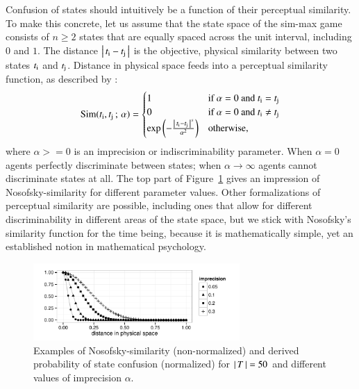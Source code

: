 \documentclass[fleqn,reqno,10pt]{article}
\newcommand{\impairment}{\ensuremath{\alpha}} %
\newcommand{\similarity}{\ensuremath{\mathrm{Sim}}} %
\begin{document}
Confusion of states should intuitively be a function of their
perceptual similarity. To make this concrete, let us assume that the
state space of the sim-max game consists of $n \ge 2$ states that are
equally spaced across the unit interval, including $0$ and $1$. The
distance $\left \lvert \, t_{\mathrm{i}} - t_{\mathrm{j}} \, \right\rvert$ is the objective, physical
similarity between two states $t_{\mathrm{i}}$ and
$t_{\mathrm{j}}$. Distance in physical space feeds into a perceptual
similarity function, as described by
\citet{Nosofsky1986:Attention-Simil}:
\begin{align*}
  \similarity(\mystate{i}, \mystate{j} \myts ; \myts \impairment) =
      \begin{cases}
    1 & \textrm{if } \impairment = 0 \textrm{ and } \mystate{i} = \mystate{j} \\
    0 & \textrm{if } \impairment = 0 \textrm{ and } \mystate{i} \neq \mystate{j} \\
 \expo \left ( -  \frac{\card{\mystate{i} - \mystate{j}}^s}{ \impairment^2} \right ) & \textrm{otherwise,} \\
    \end{cases}
\end{align*}
where $\impairment >= 0$ is an imprecision or indiscriminability
parameter. When $\impairment=0$ agents perfectly discriminate between
states; when $\impairment \rightarrow \infty$ agents cannot
discriminate states at all. The top part of
Figure~\ref{fig:NosofskySim} gives an impression of
Nosofsky-similarity for different parameter values. Other
formalizations of perceptual similarity are possible, including ones
that allow for different discriminability in different areas of the
state space, but we stick with Nosofsky's similarity function for the
time being, because it is mathematically simple, yet an established
notion in mathematical psychology.

\begin{figure}
  \centering

  \includegraphics[width=0.7\textwidth]{plots/NosofskySim.pdf}

  \caption{Examples of Nosofsky-similarity (non-normalized) and
    derived probability of state confusion (normalized) for
    $\left \lvert \, T \, \right\rvert = 50$ and different
    values of imprecision $\impairment$.}
  \label{fig:NosofskySim}
\end{figure}
\end{document}
